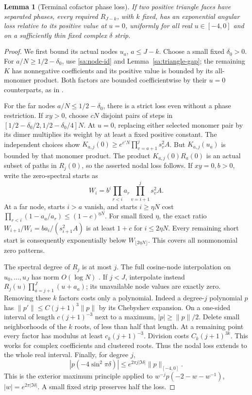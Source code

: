 \documentclass[11pt]{article}
\numberwithin{equation}{section}
\newtheorem{lemma}[theorem]{Lemma}
\theoremstyle{definition}\newtheorem{definition}[theorem]{Definition}
\theoremstyle{remark}\newtheorem{remark}[theorem]{Remark}
\begin{document}
\begin{lemma}[Terminal cofactor phase loss]\label{sa:cofactor-gap}
If two positive triangle faces have separated phases, every required
$R_{J-k}$, with $k$ fixed, has an exponential angular loss relative
to its positive value at $u=0$, uniformly for all real $u\in[-4,0]$
and on a sufficiently thin fixed complex $\delta$ strip.
\end{lemma}
\begin{proof}
We first bound its actual nodes $u_a$, $a\le J-k$. Choose a small
fixed $\delta_0>0$. For $a/N\ge1/2-\delta_0$, use
\eqref{sa:node-id} and Lemma~\ref{sa:triangle-gap}; the remaining
$K$ has nonnegative coefficients and its positive value is bounded
by its all-monomer product. Both factors are bounded coefficientwise
by their $u=0$ counterparts, as in \cite[Lemma 3.1]{Local}.

For the far nodes $a/N\le1/2-\delta_0$, there is a strict loss even
without a phase restriction. If $xy>0$, choose $cN$ disjoint pairs
of steps in $[1/2-\delta_0/2,1/2-\delta_0/4]N$. At $u=0$, replacing
either selected monomer pair by its dimer multiplies its weight by
at least a fixed positive constant. The independent choices show
$K_{a,j}(0)\ge e^{c'N}\prod_{v=a+1}^j s_v^2A$.
But $K_{a,j}(u_a)$ is bounded by that monomer product. The product
$K_{a,j}(0)R_a(0)$ is an actual subset of paths in $R_j(0)$,
so the asserted nodal loss follows.
If $xy=0,b>0$, write the zero-spectral starts as
\[
 W_i=b^i\prod_{r<i}a_r\prod_{v=i+1}^j s_v^2A.
\]
At a far node, starts $i>a$ vanish, and starts $i\ge\eta N$ cost
$\prod_{r<i}(1-a_a/a_r)\le(1-c)^{\eta N}$.
For small fixed $\eta$, the exact ratio
$W_{i+1}/W_i=ba_i/(s_{i+1}^2A)$ is at least $1+c$ for
$i\le2\eta N$. Every remaining short start is consequently
exponentially below $W_{\lfloor2\eta N\rfloor}$.
This covers all nonmonomial zero patterns.

The spectral degree of $R_j$ is at most $j$. The full cosine-node
interpolation on $u_0,\ldots,u_J$ has norm $O(\log N)$
\cite[Lemma 3.2]{Local}. If $j<J$, interpolate instead
$R_j(u)\prod_{a=j+1}^J(u+a_a)$; its unavailable node values are
exactly zero. Removing these $k$ factors costs only a polynomial.
Indeed a degree-$j$ polynomial $p$ has
$\|p'\|\le C(j+1)^3\|p\|$ by its Chebyshev expansion. On a
one-sided interval of length $c(j+1)^{-3}$ next to a maximum,
$|p|\ge\|p\|/2$. Delete small neighborhoods of the $k$ roots,
of less than half that length. At a remaining point every factor
has modulus at least $c_k(j+1)^{-3}$. Division costs
$C_k(j+1)^{3k}$. This works for complex coefficients and clustered roots.
Thus the nodal loss extends to the whole real interval. Finally,
for degree $j$,
\[
 |p(-4\sin^2\pi\delta)|\le
       e^{2\pi j|\Im\delta|}\|p\|_{[-4,0]}.
\]
This is the exterior maximum principle applied to
$w^{-j}p(-2-w-w^{-1})$, $|w|=e^{2\pi|\Im\delta|}$.
A small fixed strip preserves half the loss.
\end{proof}
\end{document}
